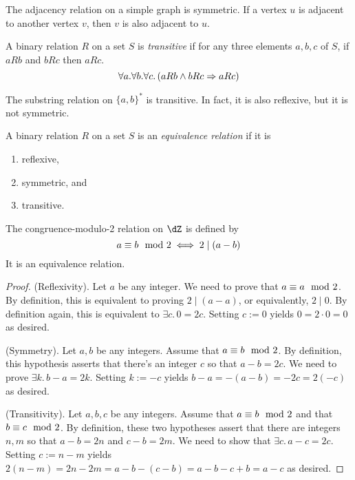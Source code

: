 \documentclass{amsart}
\begin{document}
\begin{eg}
  The adjacency relation on a simple graph is symmetric.
  If a vertex $u$ is adjacent to another vertex $v$, then $v$ is also adjacent to $u$.
\end{eg}

\begin{defn}[Transitivity]
  A binary relation $R$ on a set $S$ is \emph{transitive} if for any three elements $a,b,c$ of $S$, if $aRb$ and $bRc$ then $aRc$.
  \[
    \forall a.\forall b.\forall c.\,(aRb \wedge bRc \Rightarrow aRc)
  \]
\end{defn}

\begin{eg}
  The substring relation on $\{a,b\}^{*}$ is transitive.
  In fact, it is also reflexive, but it is not symmetric.
\end{eg}

\begin{defn}
  A binary relation $R$ on a set $S$ is an \emph{equivalence relation} if it is
  \begin{enumerate}
  \item reflexive,
  \item symmetric, and
  \item transitive.
  \end{enumerate}
\end{defn}

\begin{prop}\label{prop:cng-mod-equiv}
  The congruence-modulo-2 relation on $\dZ$ is defined by
  \[
    a \equiv b \mod{2} \iff 2 \mid (a - b)
  \]
  It is an equivalence relation.
\end{prop}
\begin{proof}
  (Reflexivity). Let $a$ be any integer.
  We need to prove that $a \equiv a \mod{2}$.
  By definition, this is equivalent to proving $2 \mid (a - a)$, or equivalently, $2 \mid 0$.
  By definition again, this is equivalent to $\exists c.\,0 = 2c$.
  Setting $c := 0$ yields $0 = 2 \cdot 0 = 0$ as desired.

  (Symmetry). Let $a, b$ be any integers.
  Assume that $a \equiv b \mod{2}$.
  By definition, this hypothesis asserts that there's an integer $c$ so that $a - b = 2c$.
  We need to prove $\exists k.\,b - a = 2k$.
  Setting $k := -c$ yields $b - a = -(a - b) = -2c = 2(-c)$ as desired.

  (Transitivity). Let $a, b, c$ be any integers.
  Assume that $a \equiv b \mod{2}$ and that $b \equiv c \mod{2}$.
  By definition, these two hypotheses assert that there are integers $n, m$ so that $a - b = 2n$ and $c - b = 2m$.
  We need to show that $\exists c.\,a - c = 2c$.
  Setting $c := n - m$ yields $2(n - m) = 2n - 2m = a - b - (c - b) = a - b - c + b = a - c$ as desired.
\end{proof}
\end{document}
